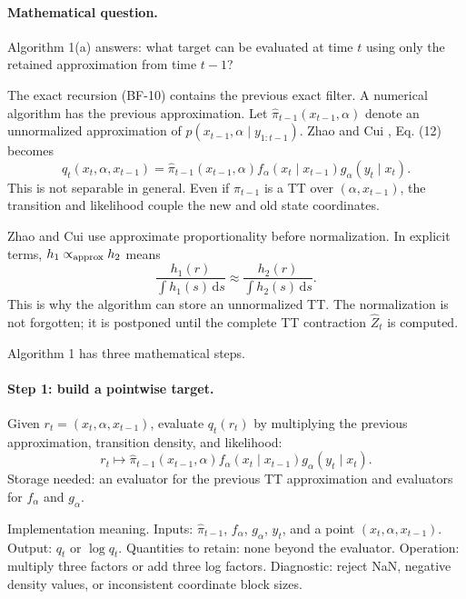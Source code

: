 \documentclass[11pt]{article}
\numberwithin{equation}{section}
\newcommand{\dd}{\,\mathrm d}
\begin{document}
\paragraph{Mathematical question.}
Algorithm 1(a) answers: what target can be evaluated at time \(t\) using only
the retained approximation from time \(t-1\)?

The exact recursion (BF-10) contains the previous exact filter.  A numerical
algorithm has the previous approximation.  Let
\(\widehat\pi_{t-1}(x_{t-1},\alpha)\) denote an unnormalized approximation of
\(p(x_{t-1},\alpha\mid y_{1:t-1})\).  Zhao and Cui \cite{zhao2024ttsequential}, Eq. (12) becomes
\begin{equation}
    q_t(x_t,\alpha,x_{t-1})
    =
    \widehat\pi_{t-1}(x_{t-1},\alpha)
    f_\alpha(x_t\mid x_{t-1})
    g_\alpha(y_t\mid x_t).
    \label{eq:p24-a1-1}
\end{equation}
This is not separable in general.  Even if
\(\widehat\pi_{t-1}\) is a TT over \((\alpha,x_{t-1})\), the transition and
likelihood couple the new and old state coordinates.

Zhao and Cui \cite{zhao2024ttsequential} use approximate proportionality before normalization.  In explicit
terms, \(h_1\propto_{\rm approx} h_2\) means
\begin{equation}
    \frac{h_1(r)}{\int h_1(s)\dd s}
    \approx
    \frac{h_2(r)}{\int h_2(s)\dd s}.
    \label{eq:p24-a1-0}
\end{equation}
This is why the algorithm can store an unnormalized TT.  The normalization is
not forgotten; it is postponed until the complete TT contraction
\(\widehat Z_t\) is computed.

Algorithm 1 has three mathematical steps.

\paragraph{Step 1: build a pointwise target.}
Given \(r_t=(x_t,\alpha,x_{t-1})\), evaluate \(q_t(r_t)\) by multiplying the
previous approximation, transition density, and likelihood:
\[
    r_t\mapsto
    \widehat\pi_{t-1}(x_{t-1},\alpha)
    f_\alpha(x_t\mid x_{t-1})
    g_\alpha(y_t\mid x_t).
\]
Storage needed: an evaluator for the previous TT approximation and evaluators
for \(f_\alpha\) and \(g_\alpha\).

Implementation meaning. Inputs:
\(\widehat\pi_{t-1}\), \(f_\alpha\), \(g_\alpha\), \(y_t\), and a point
\((x_t,\alpha,x_{t-1})\).  Output: \(q_t\) or \(\log q_t\).  Quantities to retain:
none beyond the evaluator.  Operation: multiply three factors or add three log
factors.  Diagnostic: reject NaN, negative density values, or inconsistent
coordinate block sizes.
\end{document}
